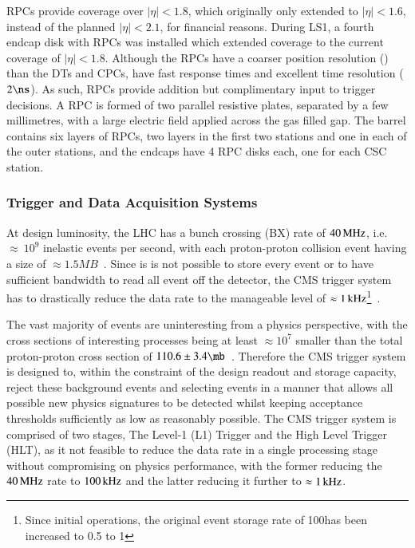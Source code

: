RPCs provide coverage over $|\eta| < 1.8$, which originally only extended to $|\eta| < 1.6$, instead of the planned $|\eta| < 2.1$, for financial reasons. 
During LS1, a fourth endcap disk with RPCs was installed which extended coverage to the current coverage of $|\eta| < 1.8$\cite{Battilana:2017mrm}.
Although the RPCs have a coarser position resolution (\cm) than the DTs and CPCs, have fast response times and excellent time resolution (\approx $2\ns$).
As such, RPCs provide addition but complimentary input to trigger decisions.
A RPC is formed of two parallel resistive plates, separated by a few millimetres, with a large electric field applied across the gas filled gap.
The barrel contains six layers of RPCs, two layers in the first two stations and one in each of the outer stations, and the endcaps have 4 RPC disks each, one for each CSC station.

\subsubsection{Trigger and Data Acquisition Systems}\label{subsubsec:trigger}
At design luminosity, the LHC has a bunch crossing (BX) rate of $40\text{\,MHz}$, i.e. $\approx~10^{9}$ inelastic events per second, with each proton-proton collision event having a size of $\approx 1.5MB$~\cite{Bayatian:2006nff}.
Since is is not possible to store every event or to have sufficient bandwidth to read all event off the detector, the CMS trigger system~\cite{Dasu:2000ge,Sphicas:2002gg} has to drastically reduce the data rate to the manageable level of $\approx 1\text{\,kHz}$\footnote{Since initial operations, the original event storage rate of 100\Hz has been increased to 0.5 to 1\kHz}~\cite{Dasu:2000ge,phase1L1TDR}.

The vast majority of events are uninteresting from a physics perspective, with the cross sections of interesting processes being at least $\approx 10^{7}$ smaller than the total proton-proton cross section of $110.6 \pm3.4\mb$~\cite{Antchev:2017dia}.
Therefore the CMS trigger system is designed to, within the constraint of the design readout and storage capacity, reject these background events and selecting events in a manner that allows all possible new physics signatures to be detected whilst keeping acceptance thresholds sufficiently as low as reasonably possible.
The CMS trigger system is comprised of two stages, The Level-1 (L1) Trigger and the High Level Trigger (HLT), as it not feasible to reduce the data rate in a single processing stage without compromising on physics performance, with the former reducing the $40\text{\,MHz}$ rate to $100\text{\,kHz}$ and the latter reducing it further to $\approx 1\text{\,kHz}$.

